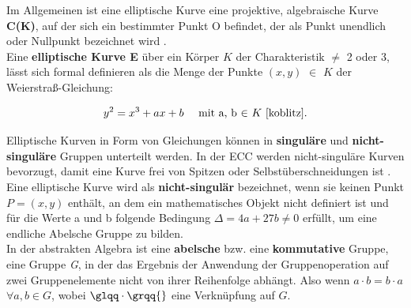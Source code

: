 Im Allgemeinen ist eine elliptische Kurve eine projektive, algebraische Kurve \textbf{C(K)}, auf der sich ein bestimmter Punkt O befindet, der als Punkt unendlich oder Nullpunkt bezeichnet wird \cite{GaMoDa}.\\

Eine \textbf{elliptische Kurve E} über ein Körper $ K $ der Charakteristik $ \neq $
2 oder 3, lässt sich formal definieren als die Menge der Punkte
$ (x, y) $ $ \in $ \( K \)  der Weierstraß-Gleichung:

\begin{ceqn}

\begin{equation}
       y^2 = x^3 + ax + b \quad 
       \text{ mit a, b $ \in $ $ K $           \cite{koblitz}.}
\end{equation} 

\end{ceqn}

Elliptische Kurven in Form von Gleichungen können in \textbf{singuläre} und \textbf{nicht-singuläre} Gruppen unterteilt werden. In der ECC werden nicht-singuläre Kurven bevorzugt, damit eine Kurve frei von Spitzen oder Selbstüberschneidungen ist \cite{razad}.\\

Eine elliptische Kurve wird als \textbf{nicht-singulär} bezeichnet,
wenn sie keinen Punkt $ P = (x, y) $ enthält, an dem ein
mathematisches Objekt nicht definiert ist \cite{werner} und für
die Werte a und b folgende Bedingung $ \Delta = 4a + 27b \neq 0
$ erfüllt, um eine endliche Abelsche Gruppe zu bilden.\\

In der abstrakten Algebra ist eine \textbf{abelsche} bzw. eine
\textbf{kommutative} Gruppe, eine Gruppe \textit{G}, in der das
Ergebnis der Anwendung der Gruppenoperation auf zwei
Gruppenelemente nicht von ihrer Reihenfolge abhängt. Also wenn \(a \cdot b = b \cdot a\) \quad \(\forall a, b \in \textit{G}\), wobei \(\glqq \cdot \grqq{}\) eine Verknüpfung auf $\textit{G}$.\\

